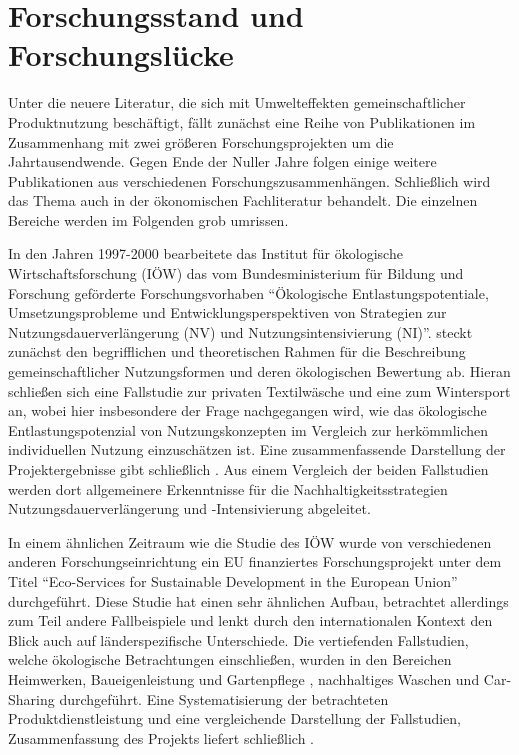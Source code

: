 \documentclass[11pt, titlepage=true]{scrartcl} %
\begin{document}
\section{Forschungsstand und Forschungslücke}\label{sec:forschung}
Unter die neuere Literatur, die sich mit Umwelteffekten gemeinschaftlicher Produktnutzung beschäftigt, fällt zunächst eine Reihe von Publikationen im Zusammenhang mit zwei größeren Forschungsprojekten um die Jahrtausendwende. Gegen Ende der Nuller Jahre folgen einige weitere Publikationen aus verschiedenen Forschungszusammenhängen. Schließlich wird das Thema auch in der ökonomischen Fachliteratur behandelt. Die einzelnen Bereiche werden im Folgenden grob umrissen.

In den Jahren 1997-2000 bearbeitete das Institut für ökologische
Wirtschaftsforschung (IÖW) das vom Bundesministerium für Bildung und Forschung geförderte
Forschungsvorhaben \enquote{Ökologische Entlastungspotentiale,
Umsetzungsprobleme und Entwicklungsperspektiven von Strategien zur
Nutzungsdauerverlängerung (NV) und Nutzungsintensivierung (NI)}.
\textcite{scholl_produkte_1998} steckt zunächst den
begrifflichen und theoretischen Rahmen für die Beschreibung gemeinschaftlicher
Nutzungsformen und deren ökologischen Bewertung ab. Hieran
schließen sich eine Fallstudie zur privaten Textilwäsche
\parencite{hirschl_produkte_2000} und eine zum Wintersport
\parencite{konrad_produkte_2000} an, wobei hier insbesondere der
Frage nachgegangen wird, wie das ökologische Entlastungspotenzial
von Nutzungskonzepten im Vergleich zur herkömmlichen individuellen
Nutzung einzuschätzen ist. Eine zusammenfassende Darstellung der
Projektergebnisse gibt schließlich
\textcite{hirschl_nachhaltige_2001}. Aus einem Vergleich der beiden
Fallstudien werden dort allgemeinere Erkenntnisse für die
Nachhaltigkeitsstrategien Nutzungsdauerverlängerung und
-Intensivierung abgeleitet.

In einem ähnlichen Zeitraum wie die Studie des IÖW wurde
von verschiedenen anderen
Forschungseinrichtung ein EU finanziertes Forschungsprojekt
unter dem Titel \enquote{Eco-Services for Sustainable Development in
the European Union} durchgeführt. Diese Studie hat einen sehr ähnlichen Aufbau, betrachtet
allerdings zum Teil andere Fallbeispiele und lenkt durch
den internationalen Kontext den Blick auch auf länderspezifische
Unterschiede. Die vertiefenden Fallstudien, welche ökologische Betrachtungen
einschließen, wurden in den  Bereichen Heimwerken, Baueigenleistung
und Gartenpflege \parencite{behrendt_oko-rent_2000}, nachhaltiges
Waschen \parencite{behrendt_nachhaltig_2000} und
Car-Sharing \parencite{behrendt_car-sharing_2000} durchgeführt. Eine
Systematisierung der betrachteten Produktdienstleistung und eine
vergleichende Darstellung der Fallstudien, Zusammenfassung des
Projekts liefert schließlich \textcite{behrendt_eco-service_2003}.
\end{document}
